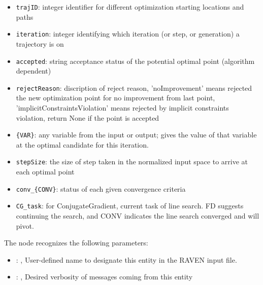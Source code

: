         \begin{itemize}
          \item \texttt{trajID}: integer identifier for different optimization starting locations and paths
             \item \texttt{iteration}: integer identifying which iteration (or step, or generation) a trajectory is on
             \item \texttt{accepted}: string acceptance status of the potential optimal point (algorithm dependent)
             \item \texttt{rejectReason}: discription of reject reason, 'noImprovement' means rejected the new optimization point for no improvement from last point, 'implicitConstraintsViolation' means rejected by implicit constraints violation, return None if the point is accepted
             \item \texttt{\{VAR\}}: any variable from the  input or output; gives the value of that variable at the optimal candidate for this iteration.
             \item \texttt{stepSize}: the size of step taken in the normalized input space to arrive at each optimal point
             \item \texttt{conv\_\{CONV\}}: status of each given convergence criteria
             \item \texttt{CG\_task}: for ConjugateGradient, current task of line search. FD suggests continuing the search, and CONV indicates the line search converged and will pivot.
           
         \end{itemize}

  The  node recognizes the following parameters:
    \begin{itemize}
      \item {}: , 
        User-defined name to designate this entity in the RAVEN input file.
      \item {}: , 
        Desired verbosity of messages coming from this entity
  \end{itemize}

